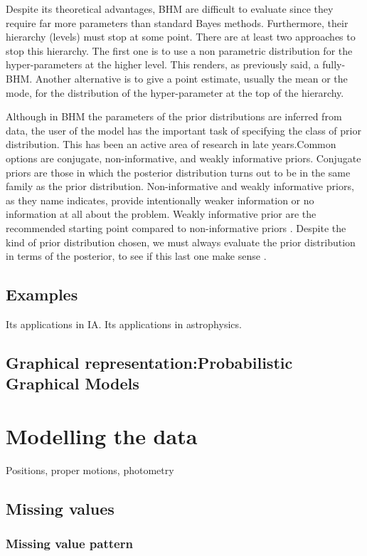 Despite its theoretical advantages, BHM are difficult to evaluate since they require far more parameters than standard Bayes methods.
Furthermore, their hierarchy (levels) must stop at some point. There are at least two approaches to stop this hierarchy. The first one is to use a non parametric distribution for the hyper-parameters at the higher level. This renders, as previously said, a fully-BHM. Another alternative is to give a point estimate, usually the mean or the mode, for the distribution of the hyper-parameter at the top of the hierarchy.  

Although in BHM the parameters of the prior distributions are inferred from data, the user of the model has the important task of specifying the class of prior distribution. This has been an active area of research in late years.Common options are conjugate, non-informative, and weakly informative priors. Conjugate priors are those in which the posterior distribution turns out to be in the same family as the prior distribution. Non-informative and weakly informative priors, as they name indicates, provide intentionally weaker information or no information at all about the problem. Weakly informative prior are the recommended starting point compared to non-informative priors \cite[see for example the works of][]{Gelman2006,Huang2013,Chung2015}. Despite the kind of prior distribution chosen, we must always evaluate the prior distribution in terms of the posterior, to see if this last one make sense \citep{Gelman2006}.
\subsection{Examples}
Its applications in IA.
Its applications in astrophysics.
\subsection{Graphical representation:Probabilistic Graphical Models}

\section{Modelling the data}
Positions, proper motions, photometry
\subsection{Missing values}
\subsubsection{Missing value pattern}
